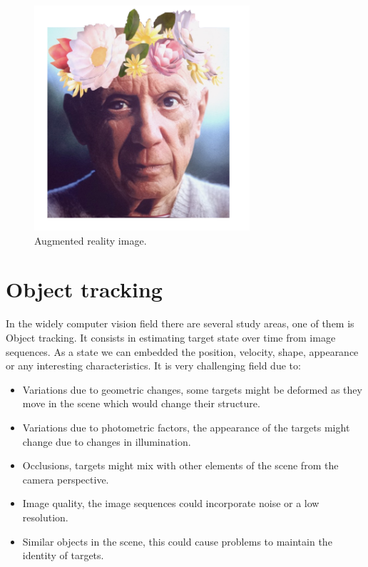 \begin{figure}[H]
\centering         
\includegraphics[width=8cm]{aplicaciones/picassioHuai.png}
\caption{Augmented reality image.} \label{introrgbd}
\end{figure}





\section{Object tracking}

In the widely computer vision field there are several study areas, one of them is Object tracking. It consists in estimating target state over time from image sequences. As a state we can embedded the position, velocity, shape, appearance or any interesting characteristics. It is very challenging field due to:


\begin{itemize}

\item Variations due to geometric changes, some targets might be deformed as they move in the scene which would change their structure.

\item Variations due to photometric factors, the appearance of the targets might change due to changes in illumination.

\item Occlusions, targets might mix with other elements of the scene from the camera perspective.

\item Image quality, the image sequences could incorporate noise or a low resolution.

\item Similar objects in the scene, this could cause problems to maintain the identity of targets.

\end{itemize}

